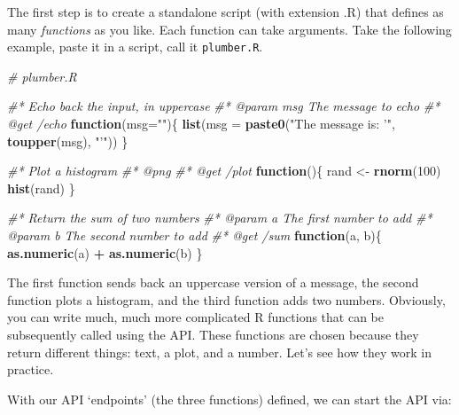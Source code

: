 \documentclass[]{book}
\newenvironment{Shaded}{\begin{snugshade}}{\end{snugshade}}
\newcommand{\CommentTok}[1]{\textcolor[rgb]{0.56,0.35,0.01}{\textit{#1}}}
\newcommand{\ControlFlowTok}[1]{\textcolor[rgb]{0.13,0.29,0.53}{\textbf{#1}}}
\newcommand{\DataTypeTok}[1]{\textcolor[rgb]{0.13,0.29,0.53}{#1}}
\newcommand{\DecValTok}[1]{\textcolor[rgb]{0.00,0.00,0.81}{#1}}
\newcommand{\KeywordTok}[1]{\textcolor[rgb]{0.13,0.29,0.53}{\textbf{#1}}}
\newcommand{\NormalTok}[1]{#1}
\newcommand{\OperatorTok}[1]{\textcolor[rgb]{0.81,0.36,0.00}{\textbf{#1}}}
\newcommand{\StringTok}[1]{\textcolor[rgb]{0.31,0.60,0.02}{#1}}
\begin{document}
The first step is to create a standalone script (with extension .R) that defines as many \emph{functions} as you like. Each function can take arguments. Take the following example, paste it in a script, call it \texttt{plumber.R}.

\begin{Shaded}
\begin{Highlighting}[]
\CommentTok{# plumber.R}

\CommentTok{#* Echo back the input, in uppercase}
\CommentTok{#* @param msg The message to echo}
\CommentTok{#* @get /echo}
\ControlFlowTok{function}\NormalTok{(}\DataTypeTok{msg=}\StringTok{""}\NormalTok{)\{}
  \KeywordTok{list}\NormalTok{(}\DataTypeTok{msg =} \KeywordTok{paste0}\NormalTok{(}\StringTok{"The message is: '"}\NormalTok{, }\KeywordTok{toupper}\NormalTok{(msg), }\StringTok{"'"}\NormalTok{))}
\NormalTok{\}}

\CommentTok{#* Plot a histogram}
\CommentTok{#* @png}
\CommentTok{#* @get /plot}
\ControlFlowTok{function}\NormalTok{()\{}
\NormalTok{  rand <-}\StringTok{ }\KeywordTok{rnorm}\NormalTok{(}\DecValTok{100}\NormalTok{)}
  \KeywordTok{hist}\NormalTok{(rand)}
\NormalTok{\}}

\CommentTok{#* Return the sum of two numbers}
\CommentTok{#* @param a The first number to add}
\CommentTok{#* @param b The second number to add}
\CommentTok{#* @get /sum}
\ControlFlowTok{function}\NormalTok{(a, b)\{}
  \KeywordTok{as.numeric}\NormalTok{(a) }\OperatorTok{+}\StringTok{ }\KeywordTok{as.numeric}\NormalTok{(b)}
\NormalTok{\}}
\end{Highlighting}
\end{Shaded}

The first function sends back an uppercase version of a message, the second function plots a histogram, and the third function adds two numbers. Obviously, you can write much, much more complicated R functions that can be subsequently called using the API. These functions are chosen because they return different things: text, a plot, and a number. Let's see how they work in practice.

With our API `endpoints' (the three functions) defined, we can start the API via:

\begin{Shaded}
\end{Shaded}
\end{document}
